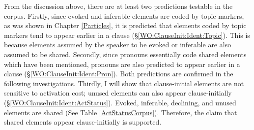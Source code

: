 %
%
%

From the discussion above,
there are at least two predictions testable in the corpus.
Firstly, since evoked and inferable elements are coded by topic markers, as was shown in Chapter \ref{Particles},
it is predicted that
elements coded by topic markers tend to appear earlier in a clause (\S \ref{WO:ClauseInit:Ident:Topic}).
This is because elements assumed by the speaker to be evoked or inferable
are also assumed to be shared.
Secondly,
since pronouns essentially code shared elements which have been mentioned,
pronouns are also predicted to appear earlier in a clause (\S \ref{WO:ClauseInit:Ident:Pron}).
Both predictions are confirmed in the following investigations.
Thirdly, I will show that clause-initial elements are not sensitive to activation cost;
unused elements can also appear clause-initially (\S \ref{WO:ClauseInit:Ident:ActStatus}).
Evoked, inferable, declining, and unused elements are shared
(See Table \ref{ActStatusCorpus}).
Therefore, the claim that shared elements appear clause-initially is supported.

